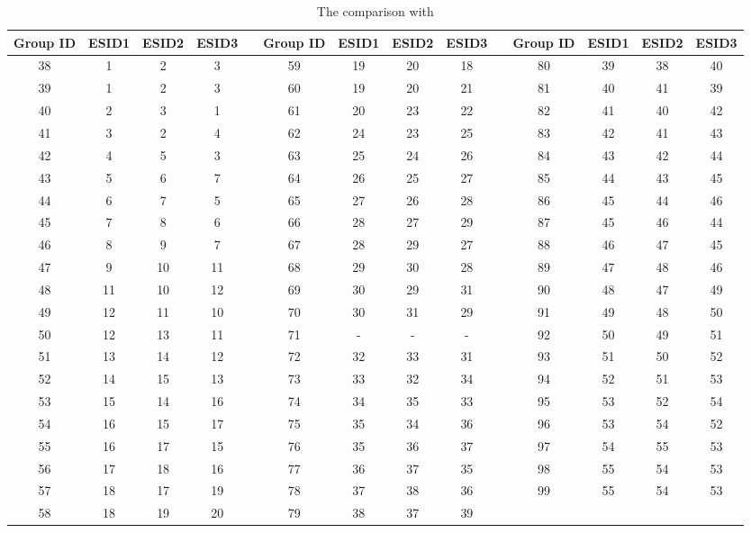 \documentclass[referee]{raa}            %
\begin{document}
\begin{table}
\bc
\begin{minipage}[]{100mm}
\caption[]{The comparison with \cite{mcgurk2010principal}  \label{tab3}}\end{minipage}
\setlength{\tabcolsep}{1pt}
\small
 \begin{tabular}{cccc|ccccc|ccccc}
  \hline\hline
Group ID	&ESID1	&ESID2	&ESID3	& 	&Group ID	&ESID1	&ESID2	&ESID3& 	&Group ID	&ESID1	&ESID2	&ESID3\\
  \hline
38	&1	&2	&3	&	&59	&19	&20	&18	&	&80	&39	&38	&40\\
39	&1	&2	&3	&	&60	&19	&20	&21	&	&81	&40	&41	&39\\
40	&2	&3	&1	&	&61	&20	&23	&22	&	&82	&41	&40	&42\\
41	&3	&2	&4	&	&62	&24	&23	&25	&	&83	&42	&41	&43\\
42	&4	&5	&3	&	&63	&25	&24	&26	&	&84	&43	&42	&44\\
43	&5	&6	&7	&	&64	&26	&25	&27	&	&85	&44	&43	&45\\
44	&6	&7	&5	&	&65	&27	&26	&28	&	&86	&45	&44	&46\\
45	&7	&8	&6	&	&66	&28	&27	&29	&	&87	&45	&46	&44\\
46	&8	&9	&7	&	&67	&28	&29	&27	&	&88	&46	&47	&45\\
47	&9	&10	&11	&	&68	&29	&30	&28	&	&89	&47	&48	&46\\
48	&11	&10	&12	&	&69	&30	&29	&31	&	&90	&48	&47	&49\\
49	&12	&11	&10	&	&70	&30	&31	&29	&	&91	&49	&48	&50\\
50	&12	&13	&11	&	&71	&-	&-	&-	&	&92	&50	&49	&51\\
51	&13	&14	&12	&	&72	&32	&33	&31	&	&93	&51	&50	&52\\
52	&14	&15	&13	&	&73	&33	&32	&34	&	&94	&52	&51	&53\\
53	&15	&14	&16	&	&74	&34	&35	&33	&	&95	&53	&52	&54\\
54	&16	&15	&17	&	&75	&35	&34	&36	&	&96	&53	&54	&52\\
55	&16	&17	&15	&	&76	&35	&36	&37	&	&97	&54	&55	&53\\
56	&17	&18	&16	&	&77	&36	&37	&35	&	&98	&55	&54	&53\\
57	&18	&17	&19	&	&78	&37	&38	&36	&	&99	&55	&54	&53\\
58	&18	&19	&20	&	&79	&38	&37	&39	&	&	&	&	&\\


 \hline\hline
\end{tabular}
\ec
\end{table}
\end{document}
